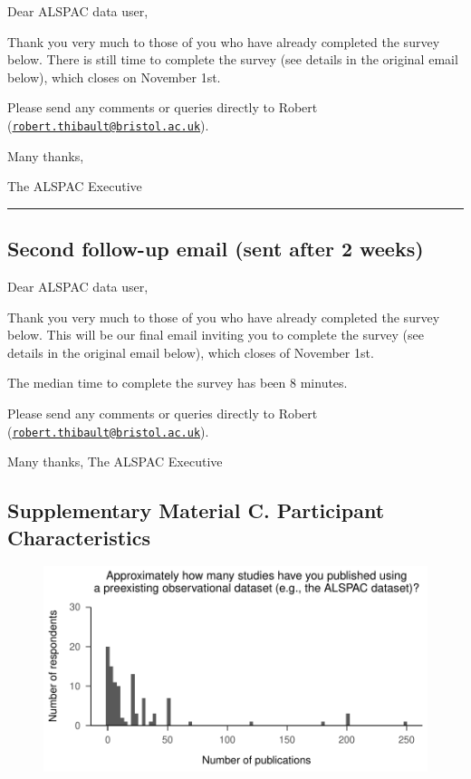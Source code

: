 \documentclass[
  man,floatsintext]{apa6}
\begin{document}
Dear ALSPAC data user,

Thank you very much to those of you who have already completed the survey below.
There is still time to complete the survey (see details in the original email below), which closes on November 1st.

Please send any comments or queries directly to Robert (\href{mailto:robert.thibault@bristol.ac.uk}{\nolinkurl{robert.thibault@bristol.ac.uk}}).

Many thanks,

The ALSPAC Executive

\begin{center}\rule{0.5\linewidth}{0.5pt}\end{center}

\hypertarget{second-follow-up-email-sent-after-2-weeks}{%
\subsection{Second follow-up email (sent after 2 weeks)}\label{second-follow-up-email-sent-after-2-weeks}}

Dear ALSPAC data user,

Thank you very much to those of you who have already completed the survey below.
This will be our final email inviting you to complete the survey (see details in the original email below), which closes of November 1st.

The median time to complete the survey has been 8 minutes.

Please send any comments or queries directly to Robert (\href{mailto:robert.thibault@bristol.ac.uk}{\nolinkurl{robert.thibault@bristol.ac.uk}}).

Many thanks,
The ALSPAC Executive

\pagebreak

\hypertarget{supplementary-material-c.-participant-characteristics}{%
\subsection{Supplementary Material C. Participant Characteristics}\label{supplementary-material-c.-participant-characteristics}}

\begin{figure}

{\centering \includegraphics[width=1\linewidth]{figs/numStudiesPlot-1} 

}

\caption{ }\label{fig:numStudiesPlot}
\end{figure}
\end{document}
